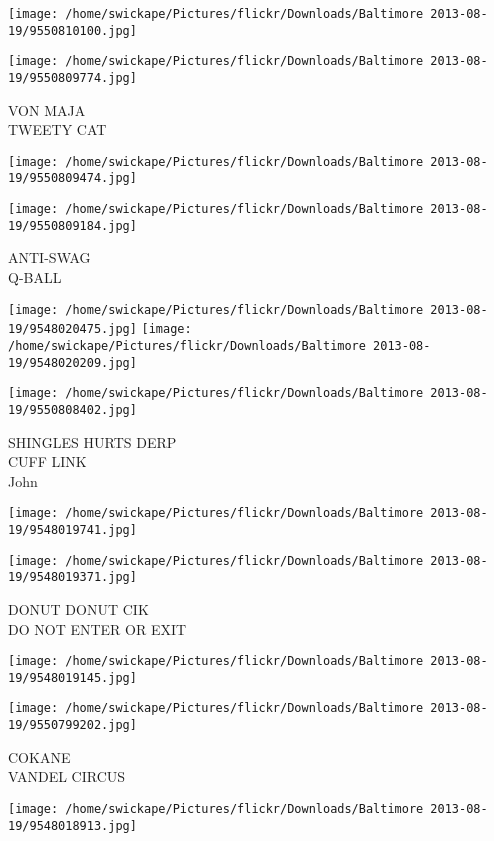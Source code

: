 \documentclass[10pt,letterpaper]{article}
\begin{document}
\texttt{[image: /home/swickape/Pictures/flickr/Downloads/Baltimore 2013-08-19/9550810100.jpg]}

\vspace{0.25in}
\texttt{[image: /home/swickape/Pictures/flickr/Downloads/Baltimore 2013-08-19/9550809774.jpg]}

VON MAJA\\
TWEETY CAT
\pagebreak

\texttt{[image: /home/swickape/Pictures/flickr/Downloads/Baltimore 2013-08-19/9550809474.jpg]}

\vspace{0.25in}
\texttt{[image: /home/swickape/Pictures/flickr/Downloads/Baltimore 2013-08-19/9550809184.jpg]}

ANTI{-}SWAG\\
Q{-}BALL
\pagebreak

\texttt{[image: /home/swickape/Pictures/flickr/Downloads/Baltimore 2013-08-19/9548020475.jpg]}
\texttt{[image: /home/swickape/Pictures/flickr/Downloads/Baltimore 2013-08-19/9548020209.jpg]}

\texttt{[image: /home/swickape/Pictures/flickr/Downloads/Baltimore 2013-08-19/9550808402.jpg]}

SHINGLES HURTS DERP\\
CUFF LINK\\
John
\pagebreak

\texttt{[image: /home/swickape/Pictures/flickr/Downloads/Baltimore 2013-08-19/9548019741.jpg]}

\vspace{0.25in}
\texttt{[image: /home/swickape/Pictures/flickr/Downloads/Baltimore 2013-08-19/9548019371.jpg]}

DONUT DONUT CIK\\
DO NOT ENTER OR EXIT
\pagebreak

\texttt{[image: /home/swickape/Pictures/flickr/Downloads/Baltimore 2013-08-19/9548019145.jpg]}

\vspace{0.25in}
\texttt{[image: /home/swickape/Pictures/flickr/Downloads/Baltimore 2013-08-19/9550799202.jpg]}

COKANE\\
VANDEL CIRCUS
\pagebreak

\texttt{[image: /home/swickape/Pictures/flickr/Downloads/Baltimore 2013-08-19/9548018913.jpg]}
\end{document}
